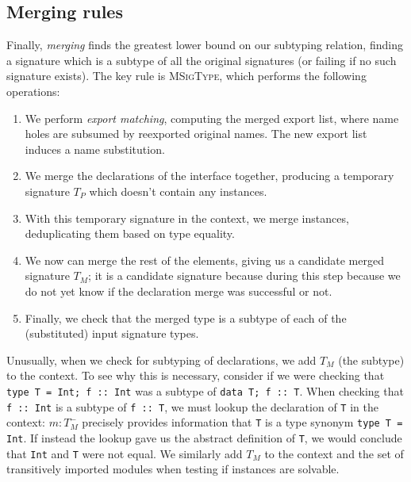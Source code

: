\subsection{Merging rules}
\label{sec:typing/merging}



Finally, \emph{merging} finds the greatest lower bound on our subtyping relation,
finding a signature which is a subtype of all the original signatures (or failing
if no such signature exists).  The key rule is \textsc{MSigType}, which performs
the following operations:

\begin{enumerate}
    \item We perform \emph{export matching}, computing the merged
    export list, where name holes are subsumed by reexported original
    names. The new export list induces a name substitution.

    \item We merge the declarations of the interface together,
    producing a temporary signature $T_P$ which doesn't contain
    any instances.

    \item With this temporary signature in the context, we
    merge instances, deduplicating them based on type equality.

    \item We now can merge the rest of the elements, giving us
    a candidate merged signature $T_M$; it is a candidate signature
    because during this step because we do not yet know if the
    declaration merge was successful or not.

    \item Finally, we check that the merged type is a subtype of each of the
    (substituted) input signature types.
\end{enumerate}
Unusually, when we check for subtyping of declarations, we add $T_M$ (the subtype)
to the context.  To see why this is necessary, consider if we were
checking that \verb|type T = Int; f :: Int| was a subtype of \verb|data T; f :: T|.
When checking that \verb|f :: Int| is a subtype of \verb|f :: T|, we must lookup
the declaration of \verb|T| in the context: $m : T_M^-$ precisely provides
information that \verb|T| is a type synonym \verb|type T = Int|.  If
instead the lookup gave us the abstract definition of \verb|T|, we would conclude
that \verb|Int| and \verb|T| were not equal.  We similarly add $T_M$ to
the context and the set of transitively imported modules when testing if instances are solvable.


